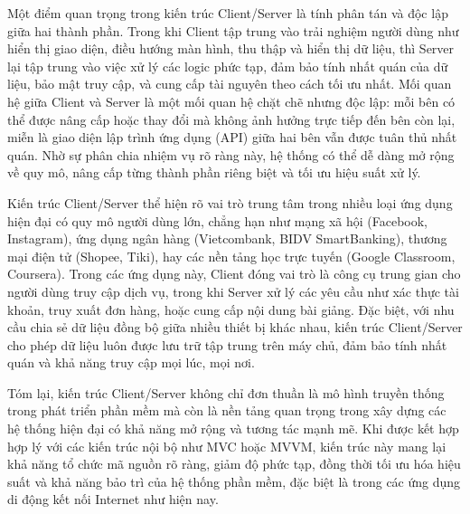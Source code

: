     \begin{flushleft}
      \hspace*{0.8cm}Một điểm quan trọng trong kiến trúc Client/Server là tính phân tán và độc lập giữa hai thành phần. Trong khi Client tập trung vào trải nghiệm người dùng như hiển thị giao diện, điều hướng màn hình, thu thập và hiển thị dữ liệu, thì Server lại tập trung vào việc xử lý các logic phức tạp, đảm bảo tính nhất quán của dữ liệu, bảo mật truy cập, và cung cấp tài nguyên theo cách tối ưu nhất. Mối quan hệ giữa Client và Server là một mối quan hệ chặt chẽ nhưng độc lập: mỗi bên có thể được nâng cấp hoặc thay đổi mà không ảnh hưởng trực tiếp đến bên còn lại, miễn là giao diện lập trình ứng dụng (API) giữa hai bên vẫn được tuân thủ nhất quán. Nhờ sự phân chia nhiệm vụ rõ ràng này, hệ thống có thể dễ dàng mở rộng về quy mô, nâng cấp từng thành phần riêng biệt và tối ưu hiệu suất xử lý.
    \end{flushleft}

    \begin{flushleft}
      \hspace*{0.8cm}Kiến trúc Client/Server thể hiện rõ vai trò trung tâm trong nhiều loại ứng dụng hiện đại có quy mô người dùng lớn, chẳng hạn như mạng xã hội (Facebook, Instagram), ứng dụng ngân hàng (Vietcombank, BIDV SmartBanking), thương mại điện tử (Shopee, Tiki), hay các nền tảng học trực tuyến (Google Classroom, Coursera). Trong các ứng dụng này, Client đóng vai trò là công cụ trung gian cho người dùng truy cập dịch vụ, trong khi Server xử lý các yêu cầu như xác thực tài khoản, truy xuất đơn hàng, hoặc cung cấp nội dung bài giảng. Đặc biệt, với nhu cầu chia sẻ dữ liệu đồng bộ giữa nhiều thiết bị khác nhau, kiến trúc Client/Server cho phép dữ liệu luôn được lưu trữ tập trung trên máy chủ, đảm bảo tính nhất quán và khả năng truy cập mọi lúc, mọi nơi.
    \end{flushleft}

    \begin{flushleft}
      \hspace*{0.8cm}Tóm lại, kiến trúc Client/Server không chỉ đơn thuần là mô hình truyền thống trong phát triển phần mềm mà còn là nền tảng quan trọng trong xây dựng các hệ thống hiện đại có khả năng mở rộng và tương tác mạnh mẽ. Khi được kết hợp hợp lý với các kiến trúc nội bộ như MVC hoặc MVVM, kiến trúc này mang lại khả năng tổ chức mã nguồn rõ ràng, giảm độ phức tạp, đồng thời tối ưu hóa hiệu suất và khả năng bảo trì của hệ thống phần mềm, đặc biệt là trong các ứng dụng di động kết nối Internet như hiện nay.
    \end{flushleft}